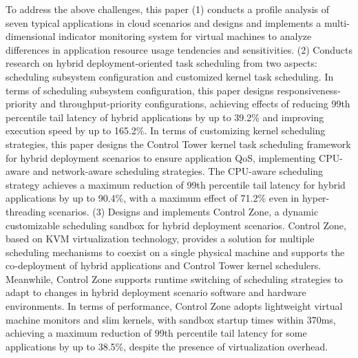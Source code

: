 To address the above challenges, this paper (1) conducts a profile analysis of seven typical applications in cloud scenarios and designs and implements a multi-dimensional indicator monitoring system for virtual machines to analyze differences in application resource usage tendencies and sensitivities. (2) Conducts research on hybrid deployment-oriented task scheduling from two aspects: scheduling subsystem configuration and customized kernel task scheduling. In terms of scheduling subsystem configuration, this paper designs responsiveness-priority and throughput-priority configurations, achieving effects of reducing 99th percentile tail latency of hybrid applications by up to 39.2\% and improving execution speed by up to 165.2\%. In terms of customizing kernel scheduling strategies, this paper designs the Control Tower kernel task scheduling framework for hybrid deployment scenarios to ensure application QoS, implementing CPU-aware and network-aware scheduling strategies. The CPU-aware scheduling strategy achieves a maximum reduction of 99th percentile tail latency for hybrid applications by up to 90.4\%, with a maximum effect of 71.2\% even in hyper-threading scenarios. (3) Designs and implements Control Zone, a dynamic customizable scheduling sandbox for hybrid deployment scenarios. Control Zone, based on KVM virtualization technology, provides a solution for multiple scheduling mechanisms to coexist on a single physical machine and supports the co-deployment of hybrid applications and Control Tower kernel schedulers. Meanwhile, Control Zone supports runtime switching of scheduling strategies to adapt to changes in hybrid deployment scenario software and hardware environments. In terms of performance, Control Zone adopts lightweight virtual machine monitors and slim kernels, with sandbox startup times within 370ms, achieving a maximum reduction of 99th percentile tail latency for some applications by up to 38.5\%, despite the presence of virtualization overhead.



\pagestyle{enfrontmatterstyle}%
\cleardoublepage\pagestyle{frontmatterstyle}%

